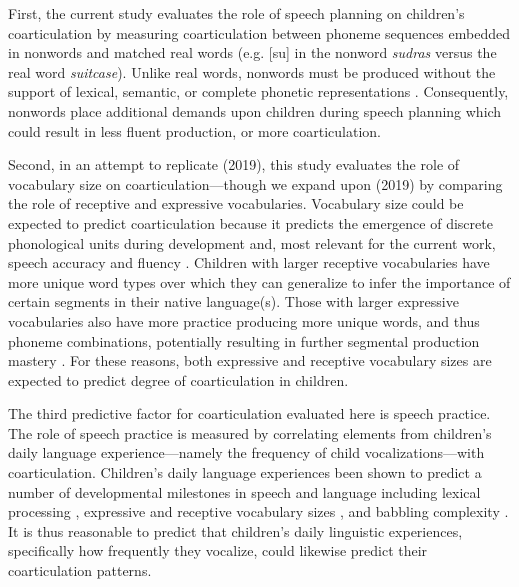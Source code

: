 \documentclass[a4paper,man,natbib,donotrepeattitle, apacite]{apa6}
\begin{document}
First, the current study evaluates the role of speech planning on children’s coarticulation by measuring coarticulation between phoneme sequences embedded in nonwords and matched real words (e.g. [su] in the nonword \textit{sudras} versus the real word \textit{suitcase}). Unlike real words, nonwords must be produced without the support of lexical, semantic, or complete phonetic representations \cite{chiatPreschoolRepetitionTest2007,cychoszLexicalAdvantageFouryearold2020,gathercoleInfluencesNumberSyllables1991,keren-portnoyRoleVocalPractice2010}. Consequently, nonwords place additional demands upon children during speech planning which could result in less fluent production, or more coarticulation.

Second, in an attempt to replicate \citeauthor{noiraySpokenLanguageDevelopment2019} (2019), this study evaluates the role of vocabulary size on coarticulation---though we expand upon \citeauthor{noiraySpokenLanguageDevelopment2019} (2019) by comparing the role of receptive and expressive vocabularies. Vocabulary size could be expected to predict coarticulation because it predicts the emergence of discrete phonological units during development \cite{edwardsInteractionVocabularySize2004,sosaLexicalPhonologicalEffects2012,stoel-gammonRelationshipsLexicalPhonological2011,storkelLexiconPhonologyInteractions2002} and, most relevant for the current work, speech accuracy and fluency \cite{cychoszLexicalAdvantageFouryearold2020,edwardsInteractionVocabularySize2004,metsalaYoungChildrenPhonological1999,munsonRelationshipsNonwordRepetition2005,zamunerPhonotacticProbabilitiesOnset2009}. Children with larger receptive vocabularies have more unique word types over which they can generalize to infer the importance of certain segments in their native language(s). Those with larger expressive vocabularies also have more practice producing more unique words, and thus phoneme combinations, potentially resulting in further segmental production mastery \cite{beckmanGeneralizingLexiconsPredict2010}. For these reasons, both expressive and receptive vocabulary sizes are expected to predict degree of coarticulation in children. 

The third predictive factor for coarticulation evaluated here is speech practice. The role of speech practice is measured by correlating elements from children’s daily language experience---namely the frequency of child vocalizations---with coarticulation. Children's daily language experiences been shown to predict a number of developmental milestones in speech and language including lexical processing \cite{weislederTalkingChildrenMatters2013}, expressive and receptive vocabulary sizes \cite{hartMeaningfulDifferencesEveryday1995,hoffSpecificityEnvironmentalInfluence2003,mahrUsingLanguageInput2018}, and babbling complexity \cite{ferjanramirezParentCoaching102019}. It is thus reasonable to predict that children’s daily linguistic experiences, specifically how frequently they vocalize, could likewise predict their coarticulation patterns. 
\end{document}
